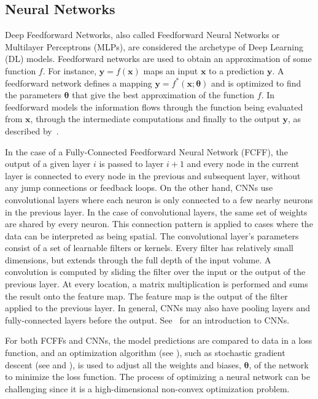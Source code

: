 \documentclass[11pt]{article}
\numberwithin{equation}{section}
\theoremstyle{plain}
\theoremstyle{definition}
\begin{document}
\subsection{Neural Networks}
\label{subsec:Neural Networks}
Deep Feedforward Networks, also called Feedforward Neural Networks or Multilayer Perceptrons (MLPs), are considered the archetype of Deep Learning (DL) models. Feedforward networks are used to obtain an approximation of some function $f$. For instance, $\mathbf{y}=f(\mathbf{x})$ maps an input $\mathbf{x}$ to a prediction $\mathbf{y}$. A feedforward network defines a mapping $\mathbf{y}=f^{*}(\mathbf{x};\boldsymbol{\theta})$ and is optimized to find the parameters $\boldsymbol{\theta}$ that give the best approximation of the function $f$. In feedforward models the information flows through the function being evaluated from $\mathbf{x}$, through the intermediate computations and finally to the output $\mathbf{y}$, as described by~\cite{Goodfellow-et-al-2016}. 

In the case of a Fully-Connected Feedforward Neural Network (FCFF), the output of a given layer $i$ is passed to layer $i+1$ and every node in the current layer is connected to every node in the previous and
subsequent layer, without any jump connections or feedback loops. On the other hand, CNNs use convolutional layers where each neuron is only connected to a few nearby neurons in the previous layer. In the case of convolutional layers, the same set of weights are shared by every neuron. This connection pattern is applied to cases where the data can be interpreted as being spatial. The convolutional layer's parameters consist of a set of learnable filters or kernels. Every filter has relatively small dimensions, but extends through the full depth of the input volume. A convolution is computed by sliding the filter over the input or the output of the previous layer. At every location, a matrix multiplication is performed and sums the result onto the feature map. The feature map is the output of the filter applied to the previous layer. In general, CNNs may also have pooling layers and fully-connected layers before the output. See~\cite{millstein2018convolutional} for an introduction to CNNs. 

For both FCFFs and CNNs, the model predictions are compared to data in a loss function, and an optimization algorithm (see \cite{ml_opt}), such as stochastic gradient descent (see \cite{sgd} and \cite{DBLP:journals/corr/Ruder16}), is used to adjust all the weights and biases, $\boldsymbol{\theta}$, of the network to minimize the loss function. The process of optimizing a neural network can be challenging since it is a high-dimensional non-convex optimization problem.
\end{document}
